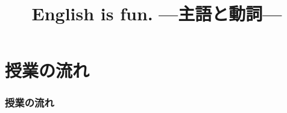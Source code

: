 \documentclass[aspectratio=169,xcolor={dvipsnames,table}]{beamer}
\title{English is fun.\,\,{}---主語と動詞---}
\author{}
\institute[]{}
\date[]
\newcommand{\myaudio}[1]{\href{#1}{\faVolumeUp}}
\begin{document}
%
%
%
%
%
%
\begin{frame}[plain,label=title]
  \titlepage
\end{frame}
%
%
%
%
%
%
%
\section*{授業の流れ}
\begin{frame}[plain]
  \frametitle{授業の流れ}
  \tableofcontents
\end{frame}
\end{document}
